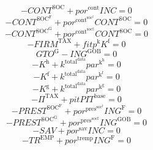 \begin{equation}
-{C\!O\!N\!T}^{\mathrm{SOC}} + {{p\!o\!r}^{\mathrm{cont}}} {{I\!N\!C}} = 0
\end{equation}
\begin{equation}
-{C\!O\!N\!T}^{\mathrm{SOC}^{\mathrm{F}}} + {{p\!o\!r}^{\mathrm{cont}^{\mathrm{soc}^{\mathrm{f}}}}} {{C\!O\!N\!T}^{\mathrm{SOC}}} = 0
\end{equation}
\begin{equation}
-{C\!O\!N\!T}^{\mathrm{SOC}^{\mathrm{G}}} + {{p\!o\!r}^{\mathrm{cont}^{\mathrm{soc}^{\mathrm{g}}}}} {{C\!O\!N\!T}^{\mathrm{SOC}}} = 0
\end{equation}
\begin{equation}
-{F\!I\!R\!M}^{\mathrm{TAX}} + {{f\!i\!t}} {p^{\mathrm{k}}} {K^{\mathrm{f}}} = 0
\end{equation}
\begin{equation}
{G\!T\!O}^{\mathrm{G}} - {I\!N\!G}^{\mathrm{GOB}} = 0
\end{equation}
\begin{equation}
-K^{\mathrm{h}} + {k^{\mathrm{total}^{\mathrm{data}}}} {{p\!a\!r}^{\mathrm{k}^{\mathrm{h}}}} = 0
\end{equation}
\begin{equation}
-K^{\mathrm{f}} + {k^{\mathrm{total}^{\mathrm{data}}}} {{p\!a\!r}^{\mathrm{k}^{\mathrm{f}}}} = 0
\end{equation}
\begin{equation}
-K^{\mathrm{g}} + {k^{\mathrm{total}^{\mathrm{data}}}} {{p\!a\!r}^{\mathrm{k}^{\mathrm{g}}}} = 0
\end{equation}
\begin{equation}
-\Pi^{\mathrm{TAX}} + {{p\!i\!t}} {{P\!I\!T}^{\mathrm{base}}} = 0
\end{equation}
\begin{equation}
-{P\!R\!E\!S\!T}^{\mathrm{SOC}^{\mathrm{F}}} + {{p\!o\!r}^{\mathrm{pres}^{\mathrm{soc}^{\mathrm{f}}}}} {{I\!N\!G}^{\mathrm{F}}} = 0
\end{equation}
\begin{equation}
-{P\!R\!E\!S\!T}^{\mathrm{SOC}^{\mathrm{G}}} + {{p\!o\!r}^{\mathrm{pres}^{\mathrm{soc}^{\mathrm{g}}}}} {{I\!N\!G}^{\mathrm{GOB}}} = 0
\end{equation}
\begin{equation}
-{S\!A\!V} + {{p\!o\!r}^{\mathrm{sav}}} {{I\!N\!C}} = 0
\end{equation}
\begin{equation}
-{T\!R}^{\mathrm{EMP}} + {{p\!o\!r}^{\mathrm{tremp}}} {{I\!N\!G}^{\mathrm{F}}} = 0
\end{equation}
